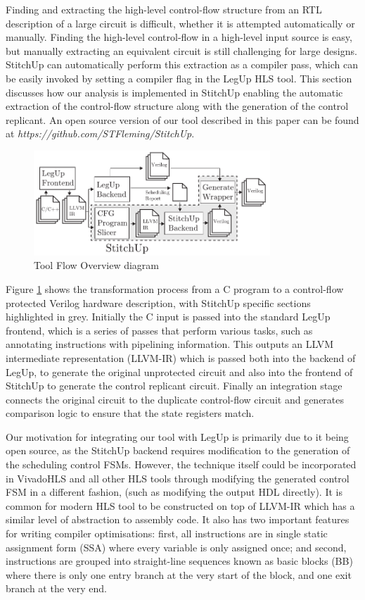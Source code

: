 Finding and extracting the high-level control-flow structure from an RTL description
of a large circuit is difficult, whether it is attempted automatically or manually.
Finding the high-level control-flow in a high-level input source is easy, but manually
extracting an equivalent circuit is still challenging for large designs.
StitchUp can automatically perform this extraction as a compiler pass, which can be
easily invoked by setting a compiler flag in the LegUp HLS tool.
This section discusses how our analysis is implemented in StitchUp enabling the automatic extraction of the
control-flow structure along with the generation of the control replicant.
An open source version of our tool described in this paper can be found at
\emph{https://github.com/STFleming/StitchUp}.

\begin{figure}[t]
\centering
\includegraphics[width=3.5in]{./imgs/tool-flow.pdf}
\caption{Tool Flow Overview diagram}
\label{fig:tool_flow_diagram}
\end{figure}

Figure \ref{fig:tool_flow_diagram} shows the transformation process from a C program
to a control-flow protected
Verilog hardware description, with StitchUp specific sections highlighted in grey.
Initially the C input is passed into the standard LegUp frontend, which is
a series of passes that
perform various tasks, such as annotating instructions with pipelining information.
This outputs an LLVM intermediate representation (LLVM-IR) which is passed both into the backend of LegUp,
to generate the
original unprotected circuit and also into the frontend of StitchUp to generate the control replicant circuit.
Finally an integration stage connects the original circuit to the duplicate control-flow circuit
and generates comparison logic to ensure that the state registers match.

Our motivation for integrating our tool with LegUp is primarily due to it being open source, as
the StitchUp backend requires modification to the generation of the scheduling control FSMs.
However, the technique itself could be incorporated in VivadoHLS and all other HLS tools through modifying the
generated control FSM in a different fashion, (such as modifying the output HDL directly).
It is common for modern HLS tool to be constructed on top of LLVM-IR which has
a similar level of abstraction to assembly code.
It also has two important features for writing compiler optimisations:
first, all instructions are in single static assignment form (SSA) where every variable is only
assigned once; and second, instructions are grouped into straight-line sequences known as basic blocks (BB)
where there is only one entry branch at the very start of the block, and one exit branch at the very end.

